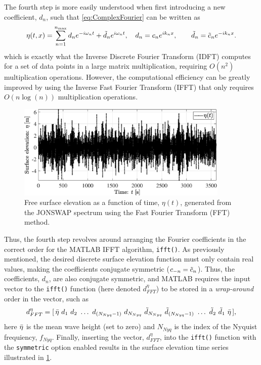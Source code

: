 The fourth step is more easily understood when first introducing a new coefficient, $d_n$, such that \cref{eq:ComplexFourier} can be written as
\begin{equation}
        \eta(t,x) = \sum_{n=1}^{n_{\text{max}}} d_n e^{-i\omega_n t} + \Tilde{d}_n e^{i\omega_n t}
    \label{eq:ComplexFourier2}, \quad d_n = c_n e^{ik_n x}, \qquad \Tilde{d}_n = \Tilde{c}_n e^{-ik_n x}.
\end{equation}
which is exactly what the Inverse Discrete Fourier Transform (IDFT) computes for a set of data points in a large matrix multiplication, requiring $O(n^2)$ multiplication operations. However, the computational efficiency can be greatly improved by using the Inverse Fast Fourier Transform (IFFT) that only requires $O(n\log{(n)})$ multiplication operations.
\begin{figure}[htbp]
    \centering
    \includegraphics[width=0.9\textwidth]{Figures/Plots/SurfaceElevation.eps}
    \caption{Free surface elevation as a function of time, $\eta(t)$, generated from the JONSWAP spectrum using the Fast Fourier Transform (FFT) method.}
    \label{fig:SurfaceElevation}
\end{figure}

Thus, the fourth step revolves around arranging the Fourier coefficients in the correct order for the MATLAB IFFT algorithm, \verb+ifft()+. As previously mentioned, the desired discrete surface elevation function must only contain real values, making the coefficients conjugate symmetric ($c_{-n}=\Tilde{c}_n$). Thus, the coefficients, $d_n$, are also conjugate symmetric, and MATLAB requires the input vector to the \verb+ifft()+ function (here denoted $d_{FFT}^\eta$) to be stored in a \textit{wrap-around} order in the vector, such as
\begin{equation}
    d_{FFT}^\eta = [\, \Bar{\eta}\ d_1\ d_2\ \dots \ d_{(N_{Nyq}-1)} \ d_{N_{Nyq}} \ \Tilde{d}_{N_{Nyq}} \ \Tilde{d}_{(N_{Nyq}-1)} \ \dots \  \Tilde{d}_2 \ \Tilde{d}_1 \ \Bar{\eta} \, ], 
    \label{eq:dfftvector}
\end{equation} 
here $\Bar{\eta}$ is the mean wave height (set to zero) and $N_{Nyq}$ is the index of the Nyquist frequiency, $f_{Nyq}$. Finally, inserting the vector, $d_{FFT}^\eta$, into the \verb+ifft()+ function with the \verb+symmetric+ option enabled results in the surface elevation time series illustrated in \cref{fig:SurfaceElevation}. 

